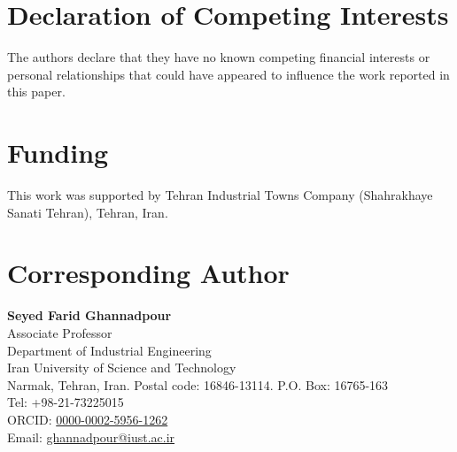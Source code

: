 \documentclass[11pt,a4paper]{article}
\begin{document}
\section*{Declaration of Competing Interests}

The authors declare that they have no known competing financial interests
or personal relationships that could have appeared to influence the work
reported in this paper.


\section*{Funding}

This work was supported by Tehran Industrial Towns Company
(Shahrakhaye Sanati Tehran), Tehran, Iran.


\section*{Corresponding Author}

\noindent\textbf{Seyed Farid Ghannadpour}\\
Associate Professor\\
Department of Industrial Engineering\\
Iran University of Science and Technology\\
Narmak, Tehran, Iran. Postal code: 16846-13114. P.O. Box: 16765-163\\
Tel: +98-21-73225015\\
ORCID: \href{https://orcid.org/0000-0002-5956-1262}{0000-0002-5956-1262}\\
Email: \href{mailto:ghannadpour@iust.ac.ir}{ghannadpour@iust.ac.ir}
\end{document}
